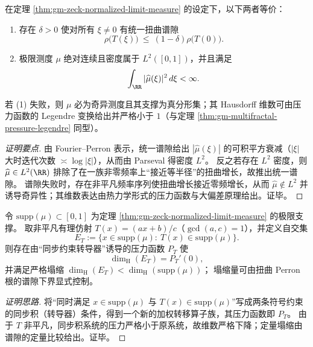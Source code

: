 \begin{theorem}\label{thm:gm-ac-singular-dichotomy}
在定理 \ref{thm:gm-zeck-normalized-limit-measure} 的设定下，以下两者等价：
\begin{enumerate}
  \item 存在 \(\delta>0\) 使对所有 \(\xi\ne 0\) 有统一扭曲谱隙
  \[
  \rho\!\bigl(T(\xi)\bigr)\ \le\ (1-\delta)\rho\!\bigl(T(0)\bigr).
  \]
  \item 极限测度 \(\mu\) 绝对连续且密度属于 \(L^2([0,1])\)，并且满足
  \[
  \int_{\RR}|\widehat\mu(\xi)|^2\,d\xi<\infty.
  \]
\end{enumerate}
若 (1) 失败，则 \(\mu\) 必为奇异测度且其支撑为真分形集；其 Hausdorff 维数可由压力函数的 Legendre 变换给出并严格小于 \(1\)（与定理 \ref{thm:gm-multifractal-pressure-legendre} 同型）。
\end{theorem}

\begin{proof}[证明要点]
由 Fourier--Perron 表示，统一谱隙给出 \(|\widehat\mu(\xi)|\) 的可积平方衰减（\(|\xi|\) 大时迭代次数 \(\asymp \log|\xi|\)），从而由 Parseval 得密度 \(L^2\)。
反之若存在 \(L^2\) 密度，则 \(\widehat\mu\in L^2(\RR)\) 排除了在一族非零频率上“接近等半径”的扭曲增长，故推出统一谱隙。
谱隙失败时，存在非平凡频率序列使扭曲增长接近零频增长，从而 \(\widehat\mu\notin L^2\) 并诱导奇异性；其维数表达由热力学形式的压力函数与大偏差原理给出。证毕。
\end{proof}

\begin{theorem}\label{thm:gm-affine-self-intersection-dimension-drop}
令 \(\mathrm{supp}(\mu)\subset[0,1]\) 为定理 \ref{thm:gm-zeck-normalized-limit-measure} 的极限支撑。
取非平凡有理仿射 \(T(x)=(ax+b)/c\)（\(\gcd(a,c)=1\)），并定义自交集
\[
E_T:=\{x\in \mathrm{supp}(\mu):\ T(x)\in \mathrm{supp}(\mu)\}.
\]
则存在由“同步约束转导器”诱导的压力函数 \(P_T\) 使
\[
\dim_{\mathrm{H}}(E_T)=P_T'(0),
\]
并满足严格塌缩
\(
\dim_{\mathrm{H}}(E_T)<\dim_{\mathrm{H}}(\mathrm{supp}(\mu))
\)；
塌缩量可由扭曲 Perron 根的谱隙下界显式控制。
\end{theorem}

\begin{proof}[证明思路]
将“同时满足 \(x\in\mathrm{supp}(\mu)\) 与 \(T(x)\in\mathrm{supp}(\mu)\)”写成两条符号约束的同步积（转导器）条件，得到一个新的加权转移算子族，其压力函数即 \(P_T\)。
由于 \(T\) 非平凡，同步积系统的压力严格小于原系统，故维数严格下降；定量塌缩由谱隙的定量比较给出。证毕。
\end{proof}

